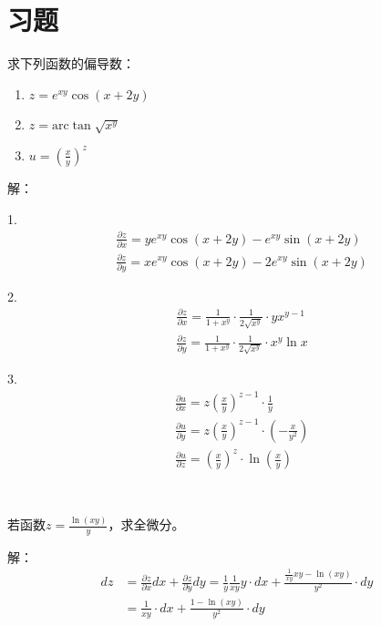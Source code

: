 \section{习题}

\begin{exercise}
求下列函数的偏导数：
\begin{enumerate}
    \item $z=e^{xy}\cos \left( x+2y \right) $
    \item $z=\mathrm{arc}\tan \sqrt{x^y}$
    \item $u=\left( \frac{x}{y} \right) ^z$
\end{enumerate}
\end{exercise}

解：

1.
\begin{align*}
&\frac{\partial z}{\partial x}=ye^{xy}\cos \left( x+2y \right) -e^{xy}\sin \left( x+2y \right) \\
&\frac{\partial z}{\partial y}=xe^{xy}\cos \left( x+2y \right) -2e^{xy}\sin \left( x+2y \right)
\end{align*}

2.
\begin{align*}
&\frac{\partial z}{\partial x}=\frac{1}{1+x^y}\cdot \frac{1}{2\sqrt{x^y}}\cdot yx^{y-1} \\
&\frac{\partial z}{\partial y}=\frac{1}{1+x^y}\cdot \frac{1}{2\sqrt{x^y}}\cdot x^y\ln x
\end{align*}

3.
\begin{align*}
&\frac{\partial u}{\partial x}=z\left( \frac{x}{y} \right) ^{z-1}\cdot \frac{1}{y} \\
&\frac{\partial u}{\partial y}=z\left( \frac{x}{y} \right) ^{z-1}\cdot \left( -\frac{x}{y^2} \right) \\
&\frac{\partial u}{\partial z}=\left( \frac{x}{y} \right) ^z\cdot \ln \left( \frac{x}{y} \right)
\end{align*}

~

\begin{exercise}
若函数$z=\frac{\ln \left( xy \right)}{y}$，求全微分。
\end{exercise}

解：
\begin{align*}
dz&=\frac{\partial z}{\partial x}dx+\frac{\partial z}{\partial y}dy=\frac{1}{y}\frac{1}{xy}y\cdot dx+\frac{\frac{1}{xy}xy-\ln \left( xy \right)}{y^2}\cdot dy \\
&=\frac{1}{xy}\cdot dx+\frac{1-\ln \left( xy \right)}{y^2}\cdot dy
\end{align*}

